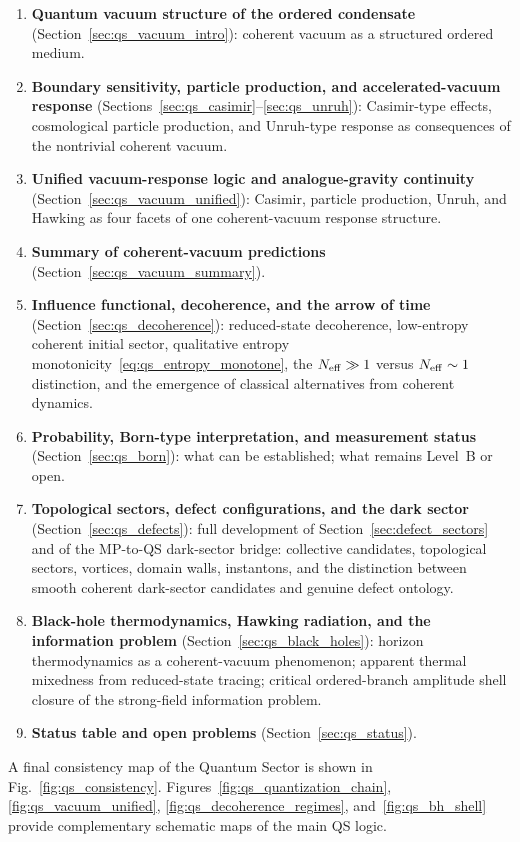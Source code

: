 \documentclass[11pt,a4paper]{article}
\numberwithin{equation}{section}
\begin{document}
\begin{enumerate}[label=(\arabic*)]
    for spinorial excitations~(Level~B); Pauli exclusion
    as conditional consequence.
  \item \textbf{Quantum vacuum structure of the ordered condensate}
    (Section~\ref{sec:qs_vacuum_intro}):
    coherent vacuum as a structured ordered medium.
  \item \textbf{Boundary sensitivity, particle production,
    and accelerated-vacuum response}
    (Sections~\ref{sec:qs_casimir}--\ref{sec:qs_unruh}):
    Casimir-type effects, cosmological particle production,
    and Unruh-type response as consequences of the nontrivial
    coherent vacuum.
  \item \textbf{Unified vacuum-response logic and analogue-gravity
    continuity}
    (Section~\ref{sec:qs_vacuum_unified}):
    Casimir, particle production, Unruh, and Hawking as four facets
    of one coherent-vacuum response structure.
  \item \textbf{Summary of coherent-vacuum predictions}
    (Section~\ref{sec:qs_vacuum_summary}).
  \item \textbf{Influence functional, decoherence, and the
    arrow of time}
    (Section~\ref{sec:qs_decoherence}):
    reduced-state decoherence, low-entropy coherent initial sector,
    qualitative entropy monotonicity~\eqref{eq:qs_entropy_monotone},
    the $N_{\rm eff}\gg1$ versus $N_{\rm eff}\sim1$ distinction,
    and the emergence of classical alternatives from coherent dynamics.
  \item \textbf{Probability, Born-type interpretation, and
    measurement status}
    (Section~\ref{sec:qs_born}):
    what can be established; what remains Level~B or open.
  \item \textbf{Topological sectors, defect configurations, and
    the dark sector}
    (Section~\ref{sec:qs_defects}):
    full development of Section~\ref{sec:defect_sectors} and of the
    MP-to-QS dark-sector bridge: collective candidates, topological
    sectors, vortices, domain walls, instantons, and the distinction
    between smooth coherent dark-sector candidates and genuine defect
    ontology.
  \item \textbf{Black-hole thermodynamics, Hawking radiation, and
    the information problem}
    (Section~\ref{sec:qs_black_holes}):
    horizon thermodynamics as a coherent-vacuum phenomenon; apparent
    thermal mixedness from reduced-state tracing; critical ordered-branch amplitude
    shell closure of the strong-field information problem.
  \item \textbf{Status table and open problems}
    (Section~\ref{sec:qs_status}).
\end{enumerate}
A final consistency map of the Quantum Sector is shown in
Fig.~\ref{fig:qs_consistency}.
Figures~\ref{fig:qs_quantization_chain}, \ref{fig:qs_vacuum_unified},
\ref{fig:qs_decoherence_regimes}, and~\ref{fig:qs_bh_shell}
provide complementary schematic maps of the main QS logic.
\end{document}
